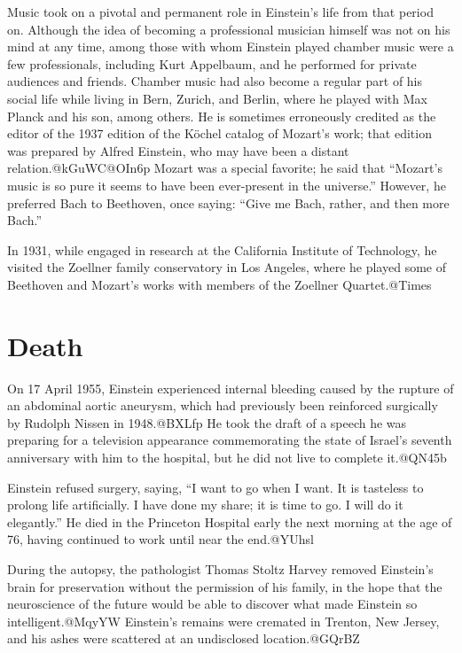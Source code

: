 \documentclass[twoside]{memoir}
\begin{document}
Music took on a pivotal and permanent role in Einstein's life from that period on. Although the idea of becoming a professional musician himself was not on his mind at any time, among those with whom Einstein played chamber music were a few professionals, including Kurt Appelbaum, and he performed for private audiences and friends. Chamber music had also become a regular part of his social life while living in Bern, Zurich, and Berlin, where he played with Max Planck and his son, among others. He is sometimes erroneously credited as the editor of the 1937 edition of the Köchel catalog of Mozart's work; that edition was prepared by Alfred Einstein, who may have been a distant relation.@kGuWC@OIn6p Mozart was a special favorite; he said that \enquote{Mozart's music is so pure it seems to have been ever-present in the universe.} However, he preferred Bach to Beethoven, once saying: \enquote{Give me Bach, rather, and then more Bach.}

In 1931, while engaged in research at the California Institute of Technology, he visited the Zoellner family conservatory in Los Angeles, where he played some of Beethoven and Mozart's works with members of the Zoellner Quartet.@Times
\chapter{Death}
On 17 April 1955, Einstein experienced internal bleeding caused by the rupture of an abdominal aortic aneurysm, which had previously been reinforced surgically by Rudolph Nissen in 1948.@BXLfp He took the draft of a speech he was preparing for a television appearance commemorating the state of Israel's seventh anniversary with him to the hospital, but he did not live to complete it.@QN45b

Einstein refused surgery, saying, \enquote{I want to go when I want. It is tasteless to prolong life artificially. I have done my share; it is time to go. I will do it elegantly.}\cite{BhiNM} He died in the Princeton Hospital early the next morning at the age of 76, having continued to work until near the end.@YUhsl

During the autopsy, the pathologist Thomas Stoltz Harvey removed Einstein's brain for preservation without the permission of his family, in the hope that the neuroscience of the future would be able to discover what made Einstein so intelligent.@MqyYW Einstein's remains were cremated in Trenton, New Jersey, and his ashes were scattered at an undisclosed location.@GQrBZ
\end{document}
